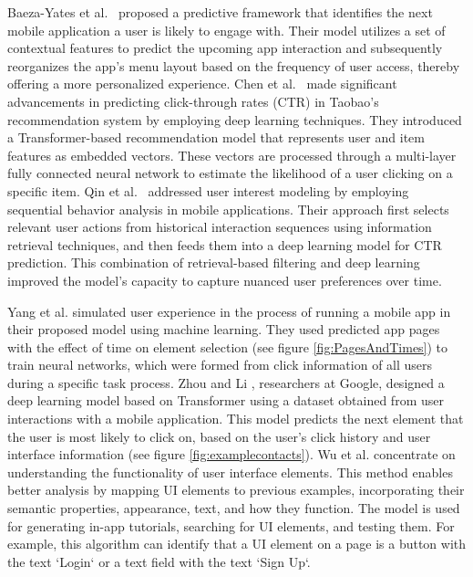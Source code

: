 \documentclass[sn-mathphys-num, Numbered]{sn-jnl}%
\theoremstyle{thmstyleone}%
\theoremstyle{thmstyletwo}%
\theoremstyle{thmstylethree}%
\providecommand{\DIFadd}[1]{{\protect\color{green!40!black}#1}} %
\providecommand{\DIFdel}[1]{}                      %
\providecommand{\DIFaddbegin}{} %
\providecommand{\DIFaddend}{} %
\providecommand{\DIFdelbegin}{} %
\providecommand{\DIFdelend}{} %
\newcommand{\DIFscaledelfig}{0.5}
\newlength{\DIFdelgraphicswidth} %
\newlength{\DIFdelgraphicsheight} %
\newcommand{\DIFaddincludegraphics}[2][]{{\color{blue}\fbox{\DIFOincludegraphics[#1]{#2}}}} %
\newcommand{\DIFdelincludegraphics}[2][]{%
\sbox{\DIFdelgraphicsbox}{\DIFOincludegraphics[#1]{#2}}%
\settoboxwidth{\DIFdelgraphicswidth}{\DIFdelgraphicsbox} %
\settoboxtotalheight{\DIFdelgraphicsheight}{\DIFdelgraphicsbox} %
\scalebox{\DIFscaledelfig}{%
\parbox[b]{\DIFdelgraphicswidth}{\usebox{\DIFdelgraphicsbox}\\[-\baselineskip] \rule{\DIFdelgraphicswidth}{0em}}\llap{\resizebox{\DIFdelgraphicswidth}{\DIFdelgraphicsheight}{%
\setlength{\unitlength}{\DIFdelgraphicswidth}%
\begin{picture}(1,1)%
\thicklines\linethickness{2pt} %
{\color[rgb]{1,0,0}\put(0,0){\framebox(1,1){}}}%
{\color[rgb]{1,0,0}\put(0,0){\line( 1,1){1}}}%
{\color[rgb]{1,0,0}\put(0,1){\line(1,-1){1}}}%
\end{picture}%
}\hspace*{3pt}}} %
} %
\DeclareRobustCommand{\DIFaddbegin}{\DIFOaddbegin \let\includegraphics\DIFaddincludegraphics} %
\DeclareRobustCommand{\DIFaddend}{\DIFOaddend \let\includegraphics\DIFOincludegraphics} %
\DeclareRobustCommand{\DIFdelbegin}{\DIFOdelbegin \let\includegraphics\DIFdelincludegraphics} %
\DeclareRobustCommand{\DIFdelend}{\DIFOaddend \let\includegraphics\DIFOincludegraphics} %
\begin{document}


Baeza-Yates et al.~\cite{bohmer2011falling} proposed a predictive framework that identifies the next mobile application a user is likely to engage with. Their model utilizes a set of contextual features to predict the upcoming app interaction and subsequently reorganizes the app\DIFdelbegin \DIFdel{?}\DIFdelend \DIFaddbegin \DIFadd{'}\DIFaddend s menu layout based on the frequency of user access, thereby offering a more personalized experience.  Chen et al.~\cite{chen2019behavior} made significant advancements in predicting click-through rates (CTR) in Taobao's recommendation system by employing deep learning techniques. They introduced a Transformer-based recommendation model that represents user and item features as embedded vectors. These vectors are processed through a multi-layer fully connected neural network to estimate the likelihood of a user clicking on a specific item. Qin et al.~\cite{qin2020user} addressed user interest modeling by employing sequential behavior analysis in mobile applications. Their approach first selects relevant user actions from historical interaction sequences using information retrieval techniques, and then feeds them into a deep learning model for CTR prediction. This combination of retrieval-based filtering and deep learning improved the model's capacity to capture nuanced user preferences over time.

Yang et al. \cite{yang2020measuring} simulated user experience in the process of running a mobile app in their proposed model using machine learning. They used predicted app pages with the effect of time on element selection (see figure \ref{fig:PagesAndTimes}) to train neural networks, which were formed from click information of all users during a specific task process. Zhou and Li \cite{zhou2021large}, researchers at Google, designed a deep learning model based on Transformer using a dataset obtained from user interactions with a mobile application. This model predicts the next element that the user is most likely to click on, based on the user's click history and user interface information (see figure \ref{fig:examplecontacts}).
Wu et al. \cite{wu2023screen} concentrate on understanding the functionality of user interface elements. This method enables better analysis by mapping UI elements to previous examples, incorporating their semantic properties, appearance, text, and how they function. The model is used for generating in-app tutorials, searching for UI elements, and testing them. For example, this algorithm can identify that a UI element on a page is a button with the text `Login` or a text field with the text `Sign Up`.
\end{document}
